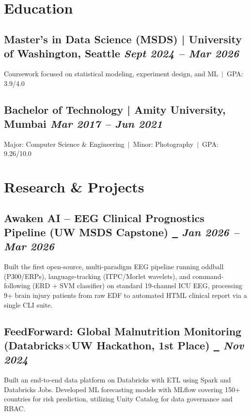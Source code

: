 \documentclass[10pt,a4paper]{article}
\begin{document}
\section*{Education}
\subsection{Master's in Data Science (MSDS) | University of Washington, Seattle \hfill
\textit{Sept 2024 -- Mar 2026}}
Coursework focused on statistical modeling, experiment design, and ML\ $|$\ GPA: 3.9/4.0

\subsection{Bachelor of Technology | Amity University, Mumbai \hfill
\textit{Mar 2017 -- Jun 2021}}
Major: Computer Science \& Engineering\ $|$\ Minor: Photography\ $|$\ GPA: 9.26/10.0

\section*{Research \& Projects}


\subsection{Awaken AI -- EEG Clinical Prognostics Pipeline (UW MSDS Capstone)%
\href{https://github.com/ayushmall0710/awaken-ai}{~\faExternalLink*} \hfill \textit{Jan 2026 -- Mar 2026}}
Built the first open-source, multi-paradigm EEG pipeline running oddball (P300/ERPs), language-tracking (ITPC/Morlet wavelets), and command-following (ERD + SVM classifier) on standard 19-channel ICU EEG, processing 9+ brain injury patients from raw EDF to automated HTML clinical report via a single CLI suite.

\subsection{FeedForward: Global Malnutrition Monitoring (Databricks$\times$UW Hackathon, 1st Place)%
\href{https://github.com/ayushmall0710/databricks-hackathon}{~\faExternalLink*} \hfill \textit{Nov 2024}}
Built an end-to-end data platform on Databricks with ETL using Spark and Databricks Jobs. Developed ML forecasting models with MLflow covering 150+ countries for risk prediction, utilizing Unity Catalog for data governance and RBAC.

\end{document}
